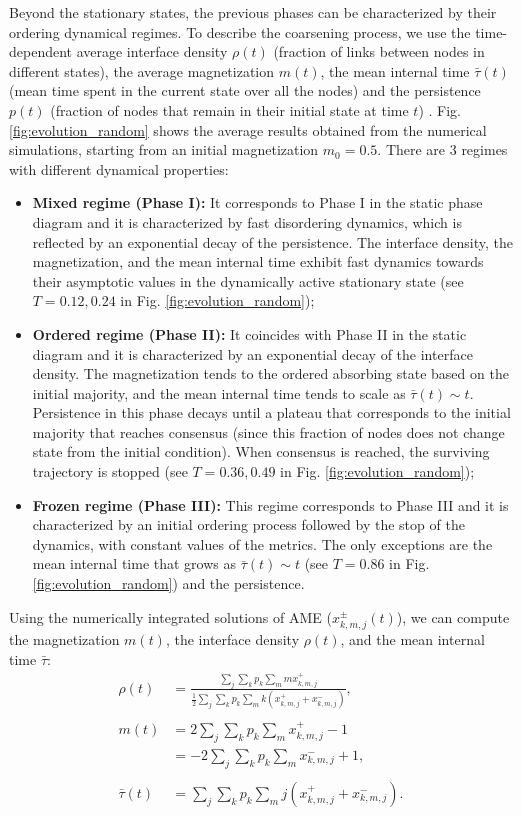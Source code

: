 	Beyond the stationary states, the previous phases can be characterized by their ordering dynamical regimes. To describe the coarsening process, we use the time-dependent average interface density $\rho(t)$ (fraction of links between nodes in different states), the average magnetization $m(t)$, the mean internal time $\bar{\tau}(t)$ (mean time spent in the current state over all the nodes) and the persistence $p(t)$ (fraction of nodes that remain in their initial state at time $t$) \cite{ben-naim-1996}. Fig. \ref{fig:evolution_random} shows the average results obtained from the numerical simulations, starting from an initial magnetization $m_0 = 0.5$. There are 3 regimes with different dynamical properties:
	\begin{itemize}
		\item \textbf{Mixed regime (Phase I):} It corresponds to Phase I in the static phase diagram and it is characterized by fast disordering dynamics, which is reflected by an exponential decay of the persistence. The interface density, the magnetization, and the mean internal time exhibit fast dynamics towards their asymptotic values in the dynamically active stationary state (see $T = 0.12, 0.24$ in Fig. \ref{fig:evolution_random});
		\item \textbf{Ordered regime (Phase II):} It coincides with Phase II in the static diagram and it is characterized by an exponential decay of the interface density. The magnetization tends to the ordered absorbing state based on the initial majority, and the mean internal time tends to scale as $\bar{\tau}(t) \sim t$. Persistence in this phase decays until a plateau that corresponds to the initial majority that reaches consensus (since this fraction of nodes does not change state from the initial condition). When consensus is reached, the surviving trajectory is stopped (see $T = 0.36, 0.49$ in Fig. \ref{fig:evolution_random});
		\item \textbf{Frozen regime (Phase III):} This regime corresponds to Phase III and it is characterized by an initial ordering process followed by the stop of the dynamics, with constant values of the metrics. The only exceptions are the mean internal time that grows as $\bar{\tau}(t) \sim t$ (see $T = 0.86$ in Fig. \ref{fig:evolution_random}) and the persistence.
	\end{itemize}
	Using the numerically integrated solutions of AME ($x^{\pm}_{k,m,j}(t)$), we can compute the magnetization $m(t)$, the interface density $\rho(t)$, and the mean internal time $\bar{\tau}$:
	\begin{eqnarray}
		\rho(t) &=  \frac{\sum_j \sum_k p_k \sum_m  m x^{+}_{k,m,j}}{\frac{1}{2} \sum_j \sum_k p_k \sum_m  k (x^{+}_{k,m,j} + x^{-}_{k,m,j})},\label{eq:interface}\\
		\nonumber\\
		m(t) &=  2 \sum_j \sum_k p_k \sum_m x^{+}_{k,m,j} - 1 \nonumber\\
		&= - 2 \sum_j \sum_k p_k \sum_m x^{-}_{k,m,j} + 1,\label{eq:magne}\\
		\nonumber\\
		\bar{\tau} (t) &=  \sum_j \sum_k p_k \sum_m j \left(x^{+}_{k,m,j} + x^{-}_{k,m,j}\right).\label{eq:time}
	\end{eqnarray}

